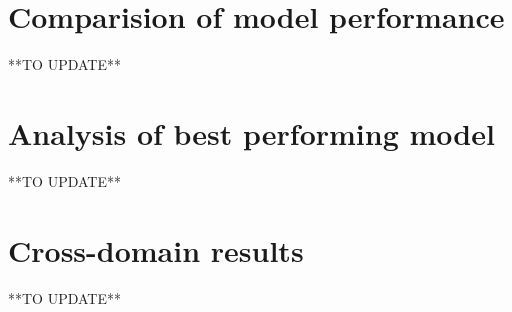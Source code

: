 \section{Comparision of model performance}
**TO UPDATE**

\section{Analysis of best performing model}
**TO UPDATE**

\section{Cross-domain results}
**TO UPDATE**